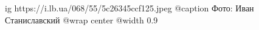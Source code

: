  
 
 
 
 

\ifcmt
  ig https://i.lb.ua/068/55/5c26345ccf125.jpeg
	@caption Фото: Иван Станиславский
  @wrap center
  @width 0.9
\fi
